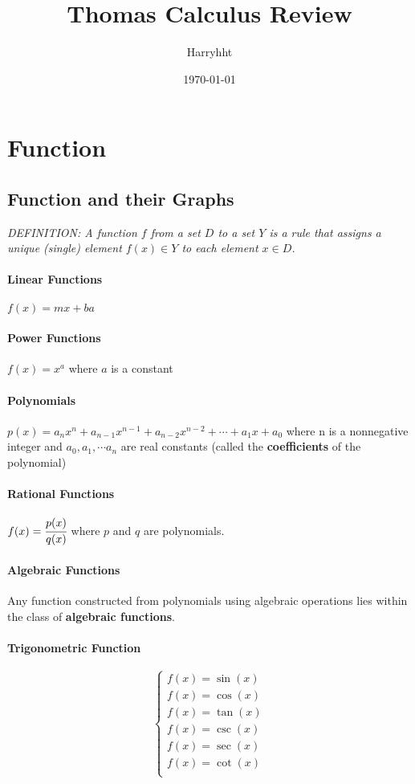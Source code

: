 \documentclass{article}
\title{Thomas Calculus Review}
\author{Harryhht}
\date{\today}
\begin{document}
    \maketitle
    \newpage
    \tableofcontents
    \newpage
    \section{Function}
        \subsection{Function and their Graphs}
            \textit{DEFINITION:
            A function $f$ from a set $D$ to a set $Y$ is a rule that assigns a unique (single) element $f(x)\in Y$ to each element $x \in D$.}
            \paragraph{Linear Functions} $f(x)=mx+ba$
            \paragraph{Power Functions} $f(x)=x^a$ where $a$ is a constant
            \paragraph{Polynomials} $p(x)=a_n x^n+ a_{n-1} x^{n-1}+a_{n-2} x^{n-2}+\cdots+a_1 x + a_0$ where n is a nonnegative integer and $a_0, a_1,\cdots a_n$ are real constants (called the \textbf{coefficients} of the polynomial) 
            \paragraph{Rational Functions} $f(x)=\cfrac{p(x)}{q(x)}$ where $p$ and $q$ are polynomials.
            \paragraph{Algebraic Functions} Any function constructed from polynomials using algebraic operations lies within the class of \textbf{algebraic functions}.
            \paragraph{Trigonometric Function}
            \begin{equation}
                \left\{
                \begin{aligned}
                    f(x)=\sin(x)\\
                    f(x)=\cos(x)\\
                    f(x)=\tan(x)\\
                    f(x)=\csc(x)\\
                    f(x)=\sec(x)\\
                    f(x)=\cot(x)\\
                \end{aligned}
                \right.
            \end{equation}
\end{document}
